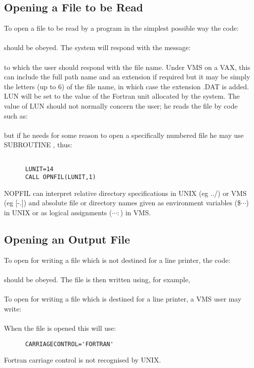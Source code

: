 \subsection{Opening a File to be Read}
To open a file to be read by a program in the simplest possible way
the code:
\\ 
\\ 
should be obeyed. The system will respond with the message:\\ 
\\ 
to which the user should respond with the file name.  Under VMS on a VAX,
this can
include the full path name and an extension if required but it may be simply the
letters (up to 6) of the file name, in which case the extension .DAT is
added.  LUN will be set to the value of the Fortran unit allocated by 
the system.
The value of LUN should not normally concern the user;  he reads the file
by code such as:\\
\\ 
but if he needs for some reason to open a specifically numbered file he may
use SUBROUTINE , thus:
\begin{verbatim} 

      LUNIT=14
      CALL OPNFIL(LUNIT,1)
\end{verbatim}
NOPFIL can interpret relative directory specifications in UNIX (eg ../) or VMS
(eg [-.]) and absolute file or directory names given as environment variables
(\$$\cdots$) in UNIX or as logical assignments ($\cdots:$) in VMS.
\subsection{Opening an Output File}
To open for writing a file which is not destined for a line printer, the
code:\\[0.2ex]
\\[0.2ex]
should be obeyed.  The file is then written using, for example,\\[0.2ex]
\\ 
To open for writing a file which is destined for a line printer, a VMS
user may write:\\[0.2ex]
\\[0.2ex]
When the file is opened this will use:
\begin{verbatim}
      CARRIAGECONTROL='FORTRAN'
\end{verbatim}
Fortran carriage control is not recognised by UNIX.

